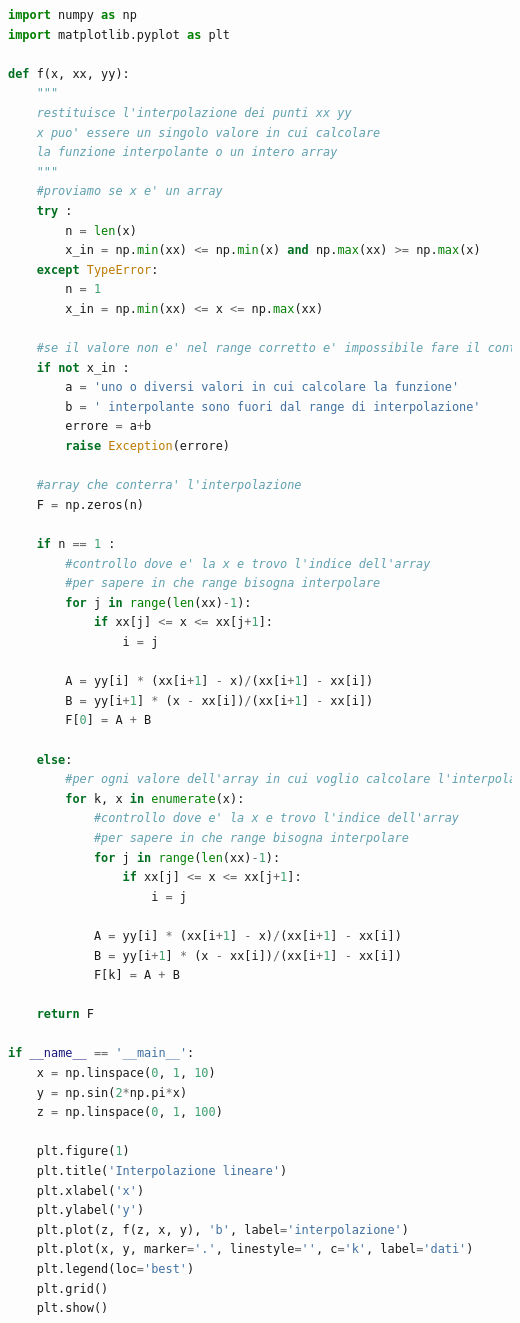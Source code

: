 \documentclass[10pt,a4paper]{article}
\begin{document}
\begin{lstlisting}[language=Python]
import numpy as np
import matplotlib.pyplot as plt

def f(x, xx, yy):
    """
    restituisce l'interpolazione dei punti xx yy
    x puo' essere un singolo valore in cui calcolare
    la funzione interpolante o un intero array
    """
    #proviamo se x e' un array
    try :
        n = len(x)
        x_in = np.min(xx) <= np.min(x) and np.max(xx) >= np.max(x)
    except TypeError:
        n = 1
        x_in = np.min(xx) <= x <= np.max(xx)

    #se il valore non e' nel range corretto e' impossibile fare il conto
    if not x_in :
        a = 'uno o diversi valori in cui calcolare la funzione'
        b = ' interpolante sono fuori dal range di interpolazione'
        errore = a+b
        raise Exception(errore)

    #array che conterra' l'interpolazione
    F = np.zeros(n)

    if n == 1 :
        #controllo dove e' la x e trovo l'indice dell'array
        #per sapere in che range bisogna interpolare
        for j in range(len(xx)-1):
            if xx[j] <= x <= xx[j+1]:
                i = j

        A = yy[i] * (xx[i+1] - x)/(xx[i+1] - xx[i])
        B = yy[i+1] * (x - xx[i])/(xx[i+1] - xx[i])
        F[0] = A + B

    else:
        #per ogni valore dell'array in cui voglio calcolare l'interpolazione
        for k, x in enumerate(x):
            #controllo dove e' la x e trovo l'indice dell'array
            #per sapere in che range bisogna interpolare
            for j in range(len(xx)-1):
                if xx[j] <= x <= xx[j+1]:
                    i = j

            A = yy[i] * (xx[i+1] - x)/(xx[i+1] - xx[i])
            B = yy[i+1] * (x - xx[i])/(xx[i+1] - xx[i])
            F[k] = A + B

    return F

if __name__ == '__main__':
    x = np.linspace(0, 1, 10)
    y = np.sin(2*np.pi*x)
    z = np.linspace(0, 1, 100)

    plt.figure(1)
    plt.title('Interpolazione lineare')
    plt.xlabel('x')
    plt.ylabel('y')
    plt.plot(z, f(z, x, y), 'b', label='interpolazione')
    plt.plot(x, y, marker='.', linestyle='', c='k', label='dati')
    plt.legend(loc='best')
    plt.grid()
    plt.show()
\end{lstlisting}
\end{document}
